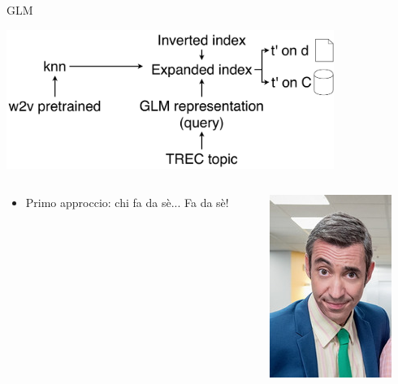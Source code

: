 \begin{frame}{GLM}
    \begin{center}
        \includegraphics[width=0.8\textwidth]{img/reproduction.pdf}
    \end{center}
    \begin{columns}
        \begin{column}{0.25\textwidth}
            \begin{itemize}
                \item Primo approccio: chi fa da sè... Fa da sè!
            \end{itemize}
        \end{column}
        \begin{column}{0.15\textwidth}
            \includegraphics[width=\columnwidth]{img/bitta.jpg}

\end{column}
\end{columns}
\end{frame}
